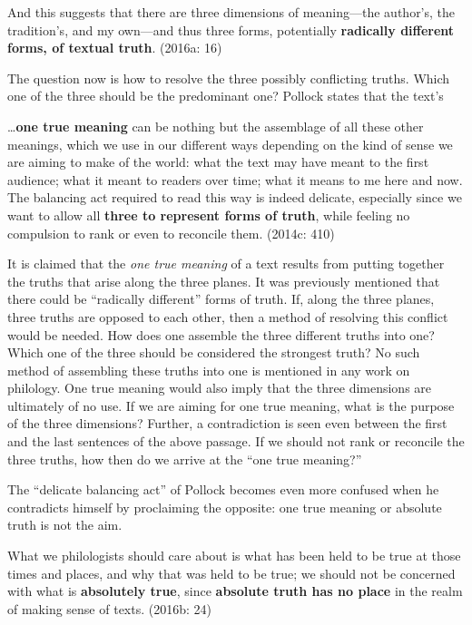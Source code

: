 \begin{myquote}
And this suggests that there are three dimensions of meaning—the author’s, the tradition’s, and my own—and thus three forms, potentially \textbf{radically different forms, of textual truth}. (2016a: 16)
\end{myquote}

The question now is how to resolve the three possibly conflicting truths. Which one of the three should be the predominant one? Pollock states that the text’s

\begin{myquote}
…\textbf{one true meaning} can be nothing but the assemblage of all these other meanings, which we use in our different ways depending on the kind of sense we are aiming to make of the world: what the text may have meant to the first audience; what it meant to readers over time; what it means to me here and now. The balancing act required to read this way is indeed delicate, especially since we want to allow all \textbf{three to represent forms of truth}, while feeling no compulsion to rank or even to reconcile them. (2014c: 410)
\end{myquote}

It is claimed that the \textit{one true meaning} of a text results from putting together the truths that arise along the three planes. It was previously mentioned that there could be “radically different” forms of truth. If, along the three planes, three truths are opposed to each other, then a method of resolving this conflict would be needed. How does one assemble the three different truths into one? Which one of the three should be considered the strongest truth? No such method of assembling these truths into one is mentioned in any work on philology. One true meaning would also imply that the three dimensions are ultimately of no use. If we are aiming for one true meaning, what is the purpose of the three dimensions? Further, a contradiction is seen even between the first and the last sentences of the above passage. If we should not rank or reconcile the three truths, how then do we arrive at the “one true meaning?”


The “delicate balancing act” of Pollock becomes even more confused when he contradicts himself by proclaiming the opposite: one true meaning or absolute truth is not the aim.

\begin{myquote}
What we philologists should care about is what has been held to be true at those times and places, and why that was held to be true; we should not be concerned with what is \textbf{absolutely true}, since \textbf{absolute truth has no place} in the realm of making sense of texts. (2016b: 24)
\end{myquote}

